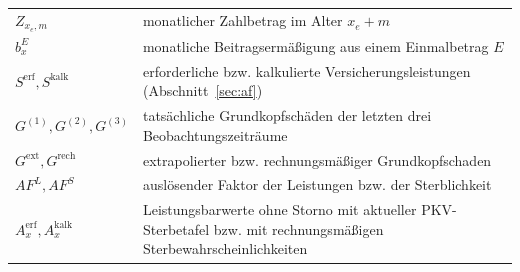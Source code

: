 \begin{center}
\begin{longtable}{@{}lp{13.5cm}@{}}
$Z_{x_e,m}$ & monatlicher Zahlbetrag im Alter $x_e+m$ \\
$b^{E}_x$ & monatliche Beitragsermäßigung aus einem Einmalbetrag $E$ \\
$S^{\mathrm{erf}}, S^{\mathrm{kalk}}$ & erforderliche bzw. kalkulierte Versicherungsleistungen (Abschnitt~\ref{sec:af}) \\
$G^{(1)}, G^{(2)}, G^{(3)}$ & tatsächliche Grundkopfschäden der letzten drei Beobachtungszeiträume \\
$G^{\mathrm{ext}}, G^{\mathrm{rech}}$ & extrapolierter bzw. rechnungsmäßiger Grundkopfschaden \\
$AF^{L}, AF^{S}$ & auslösender Faktor der Leistungen bzw. der Sterblichkeit \\
$A^{\mathrm{erf}}_x, A^{\mathrm{kalk}}_x$ & Leistungsbarwerte ohne Storno mit aktueller PKV-Sterbetafel bzw. mit rechnungsmäßigen Sterbewahrscheinlichkeiten \\
\end{longtable}
\end{center}
\addtocounter{table}{-1}
